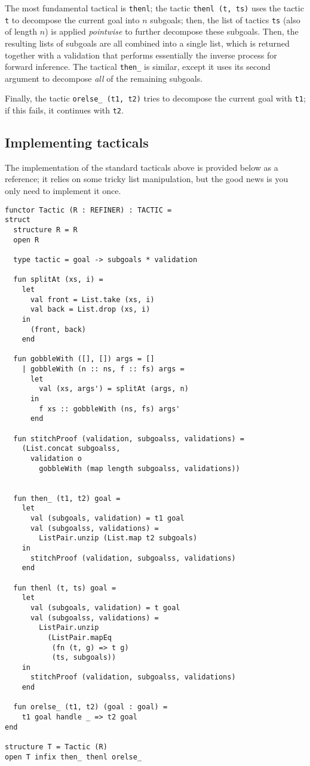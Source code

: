 \documentclass{article}
\theoremstyle{definition}
\theoremstyle{remark}
\begin{document}
The most fundamental tactical is \verb|thenl|; the tactic
\verb|thenl (t, ts)| uses the tactic \verb|t| to decompose the current
goal into $n$ subgoals; then, the list of tactics \verb|ts| (also of
length $n$) is applied \emph{pointwise} to further decompose these
subgoals. Then, the resulting lists of subgoals are all combined into
a single list, which is returned together with a validation that
performs essentially the inverse process for forward inference. The
tactical \verb|then_| is similar, except it uses its second argument
to decompose \emph{all} of the remaining subgoals.

Finally, the tactic \verb|orelse_ (t1, t2)| tries to decompose the
current goal with \verb|t1|; if this fails, it continues with
\verb|t2|.

\subsection{Implementing tacticals}

The implementation of the standard tacticals above is provided below
as a reference; it relies on some tricky list manipulation, but the
good news is you only need to implement it once.

\begin{verbatim}
functor Tactic (R : REFINER) : TACTIC =
struct
  structure R = R
  open R

  type tactic = goal -> subgoals * validation

  fun splitAt (xs, i) =
    let
      val front = List.take (xs, i)
      val back = List.drop (xs, i)
    in
      (front, back)
    end

  fun gobbleWith ([], []) args = []
    | gobbleWith (n :: ns, f :: fs) args =
      let
        val (xs, args') = splitAt (args, n)
      in
        f xs :: gobbleWith (ns, fs) args'
      end

  fun stitchProof (validation, subgoalss, validations) =
    (List.concat subgoalss,
      validation o
        gobbleWith (map length subgoalss, validations))


  fun then_ (t1, t2) goal =
    let
      val (subgoals, validation) = t1 goal
      val (subgoalss, validations) =
        ListPair.unzip (List.map t2 subgoals)
    in
      stitchProof (validation, subgoalss, validations)
    end

  fun thenl (t, ts) goal =
    let
      val (subgoals, validation) = t goal
      val (subgoalss, validations) =
        ListPair.unzip
          (ListPair.mapEq
           (fn (t, g) => t g)
           (ts, subgoals))
    in
      stitchProof (validation, subgoalss, validations)
    end

  fun orelse_ (t1, t2) (goal : goal) =
    t1 goal handle _ => t2 goal
end

structure T = Tactic (R)
open T infix then_ thenl orelse_
\end{verbatim}
\end{document}
